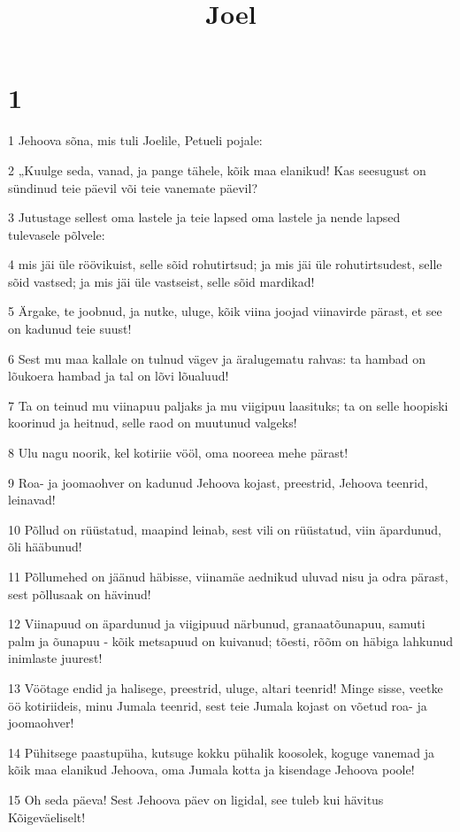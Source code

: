 

\title{Joel}

\chapter{1}

\par 1 Jehoova sõna, mis tuli Joelile, Petueli pojale: 
\par 2 „Kuulge seda, vanad, ja pange tähele, kõik maa elanikud! Kas seesugust on sündinud teie päevil või teie vanemate päevil? 
\par 3 Jutustage sellest oma lastele ja teie lapsed oma lastele ja nende lapsed tulevasele põlvele: 
\par 4 mis jäi üle röövikuist, selle sõid rohutirtsud; ja mis jäi üle rohutirtsudest, selle sõid vastsed; ja mis jäi üle vastseist, selle sõid mardikad! 
\par 5 Ärgake, te joobnud, ja nutke, uluge, kõik viina joojad viinavirde pärast, et see on kadunud teie suust! 
\par 6 Sest mu maa kallale on tulnud vägev ja äralugematu rahvas: ta hambad on lõukoera hambad ja tal on lõvi lõualuud! 
\par 7 Ta on teinud mu viinapuu paljaks ja mu viigipuu laasituks; ta on selle hoopiski koorinud ja heitnud, selle raod on muutunud valgeks! 
\par 8 Ulu nagu noorik, kel kotiriie vööl, oma nooreea mehe pärast! 
\par 9 Roa- ja joomaohver on kadunud Jehoova kojast, preestrid, Jehoova teenrid, leinavad! 
\par 10 Põllud on rüüstatud, maapind leinab, sest vili on rüüstatud, viin äpardunud, õli hääbunud! 
\par 11 Põllumehed on jäänud häbisse, viinamäe aednikud uluvad nisu ja odra pärast, sest põllusaak on hävinud! 
\par 12 Viinapuud on äpardunud ja viigipuud närbunud, granaatõunapuu, samuti palm ja õunapuu - kõik metsapuud on kuivanud; tõesti, rõõm on häbiga lahkunud inimlaste juurest! 
\par 13 Vöötage endid ja halisege, preestrid, uluge, altari teenrid! Minge sisse, veetke öö kotiriideis, minu Jumala teenrid, sest teie Jumala kojast on võetud roa- ja joomaohver! 
\par 14 Pühitsege paastupüha, kutsuge kokku pühalik koosolek, koguge vanemad ja kõik maa elanikud Jehoova, oma Jumala kotta ja kisendage Jehoova poole! 
\par 15 Oh seda päeva! Sest Jehoova päev on ligidal, see tuleb kui hävitus Kõigeväeliselt! 
